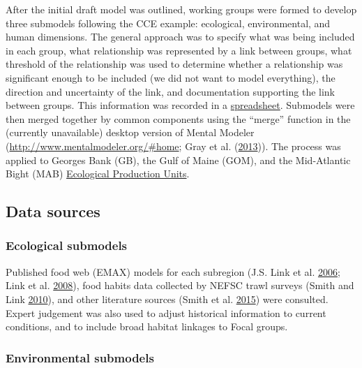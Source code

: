 \documentclass[
]{book}
\begin{document}
After the initial draft model was outlined, working groups were formed to develop three submodels following the CCE example: ecological, environmental, and human dimensions. The general approach was to specify what was being included in each group, what relationship was represented by a link between groups, what threshold of the relationship was used to determine whether a relationship was significant enough to be included (we did not want to model everything), the direction and uncertainty of the link, and documentation supporting the link between groups. This information was recorded in a \href{https://comet.nefsc.noaa.gov/erddap/tabledap/concept_model_2018.html}{spreadsheet}. Submodels were then merged together by common components using the ``merge'' function in the (currently unavailable) desktop version of Mental Modeler (\url{http://www.mentalmodeler.org/\#home}; Gray et al. (\protect\hyperlink{ref-gray_mental_2013}{2013})). The process was applied to Georges Bank (GB), the Gulf of Maine (GOM), and the Mid-Atlantic Bight (MAB) \protect\hyperlink{epu}{Ecological Production Units}.

\hypertarget{data-sources-11}{%
\subsection{Data sources}\label{data-sources-11}}

\hypertarget{ecological-submodels}{%
\subsubsection{Ecological submodels}\label{ecological-submodels}}

Published food web (EMAX) models for each subregion (J.S. Link et al. \protect\hyperlink{ref-link_documentation_2006}{2006}; Link et al. \protect\hyperlink{ref-link_northeast_2008}{2008}), food habits data collected by NEFSC trawl surveys (Smith and Link \protect\hyperlink{ref-smith_trophic_2010}{2010}), and other literature sources (Smith et al. \protect\hyperlink{ref-smith_consumption_2015}{2015}) were consulted. Expert judgement was also used to adjust historical information to current conditions, and to include broad habitat linkages to Focal groups.

\hypertarget{environmental-submodels}{%
\subsubsection{Environmental submodels}\label{environmental-submodels}}
\end{document}
